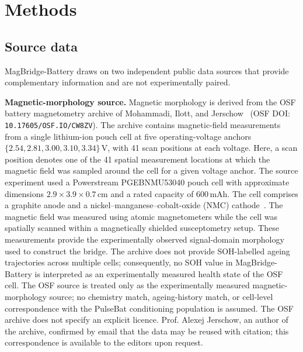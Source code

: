 \documentclass[11pt]{article}
\begin{document}
\section*{Methods}

\subsection*{Source data}

MagBridge-Battery draws on two independent public data sources that provide
complementary information and are not experimentally paired.

\textbf{Magnetic-morphology source.}
Magnetic morphology is derived from the OSF battery magnetometry archive of
Mohammadi, Ilott, and Jerschow~\cite{hu2020,mohammadi2020osf}
(OSF DOI: \texttt{10.17605/\allowbreak OSF.IO/\allowbreak CW8ZV}).
The archive contains magnetic-field measurements from a single lithium-ion
pouch cell at five operating-voltage anchors
$\{2.54, 2.81, 3.00, 3.10, 3.34\}$\,V, with 41 scan positions at each
voltage. Here, a scan position denotes one of the 41 spatial measurement
locations at which the magnetic field was sampled around the cell for a
given voltage anchor. The source experiment used a Powerstream PGEBNMU53040
pouch cell
with approximate dimensions $2.9\times3.9\times0.7$\,cm and a rated
capacity of 600\,mAh. The cell comprises a graphite anode and a
nickel--manganese--cobalt-oxide (NMC) cathode~\cite{hu2020}.
The magnetic field was measured using atomic magnetometers while the cell
was spatially scanned within a magnetically shielded susceptometry setup.
These measurements provide the experimentally observed signal-domain
morphology used to construct the bridge. The archive does not provide
SOH-labelled ageing trajectories across multiple cells; consequently,
no SOH value in MagBridge-Battery is interpreted as an experimentally measured
health state of the OSF cell. The OSF source is treated only as the experimentally measured
magnetic-morphology source; no chemistry match, ageing-history match, or
cell-level correspondence with the PulseBat conditioning population is
assumed. The OSF archive does not specify an explicit licence. Prof. Alexej
Jerschow, an author of the archive, confirmed by email that the data may be
reused with citation; this correspondence is available to the editors upon
request.
\end{document}
